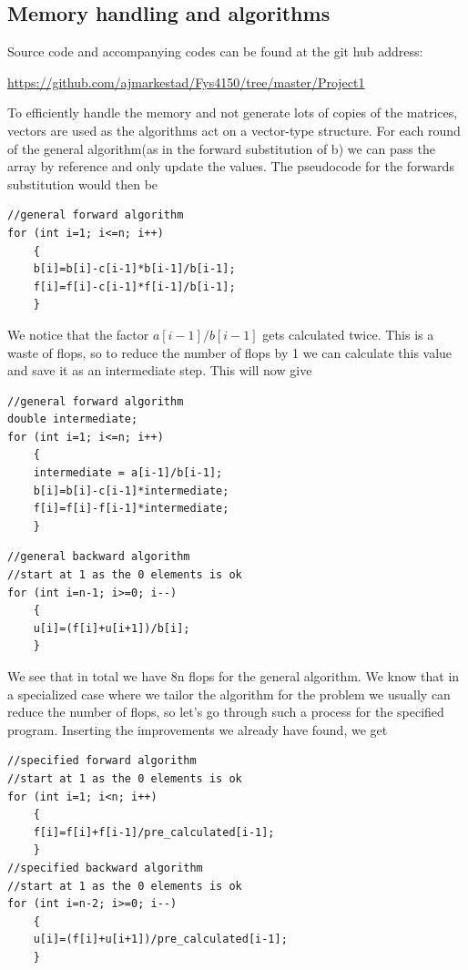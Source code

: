\documentclass[a4paper,11pt]{article}
\begin{document}
{	
\subsection{Memory handling and algorithms}

Source code and accompanying codes can be found at the git hub address:

\url{https://github.com/ajmarkestad/Fys4150/tree/master/Project1}


To efficiently handle the memory and not generate lots of copies of the matrices, vectors are used as the algorithms act on a vector-type structure. For each round of the general algorithm(as in the forward substitution of b) we can pass the array by reference and only update the values. The pseudocode for the forwards substitution would then be
\begin{lstlisting}
//general forward algorithm
for (int i=1; i<=n; i++)
	{
	b[i]=b[i]-c[i-1]*b[i-1]/b[i-1];
	f[i]=f[i]-c[i-1]*f[i-1]/b[i-1];
	}
\end{lstlisting}
		
We notice that the factor $a[i-1]/b[i-1]$ gets calculated twice. This is a waste of flops, so to reduce the number of flops by 1 we can calculate this value and save it as an intermediate step. This will now give

\begin{lstlisting}
//general forward algorithm
double intermediate; 
for (int i=1; i<=n; i++)
	{
	intermediate = a[i-1]/b[i-1];
	b[i]=b[i]-c[i-1]*intermediate;
	f[i]=f[i]-f[i-1]*intermediate;
	}
\end{lstlisting}
		
\begin{lstlisting}
//general backward algorithm
//start at 1 as the 0 elements is ok
for (int i=n-1; i>=0; i--)
	{
	u[i]=(f[i]+u[i+1])/b[i];
	}
\end{lstlisting}
		
We see that in total we have 8n flops for the general algorithm. We know that in a specialized case where we tailor the algorithm for the problem we usually can reduce the number of flops, so let's go through such a process for the specified program. Inserting the improvements we already have found, we get
		
\begin{lstlisting}
//specified forward algorithm
//start at 1 as the 0 elements is ok
for (int i=1; i<n; i++)
	{
	f[i]=f[i]+f[i-1]/pre_calculated[i-1];
	}
//specified backward algorithm
//start at 1 as the 0 elements is ok
for (int i=n-2; i>=0; i--)
	{
	u[i]=(f[i]+u[i+1])/pre_calculated[i-1];
	}
\end{lstlisting}
		
}
\end{document}
